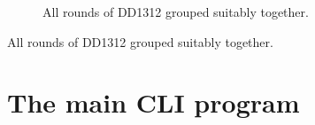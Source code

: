 \begin{figure}
\centering

\caption{All rounds of DD1312 grouped suitably together.}
\label{DD1312-grouped-figure}
\end{figure}

\begin{table}
\centering

\caption{All rounds of DD1312 grouped suitably together.}
\label{DD1312-grouped-table}
\end{table}


\chapter{The main CLI program}




\appendix



